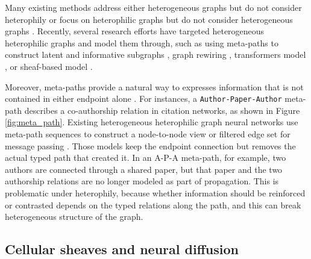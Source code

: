 Many existing methods address either heterogeneous graphs but do not consider heterophily \cite{hu2020heterogeneous,mao2023hinormer,he2024spectral,yang2023simple,wang2019heterogeneous,zhang2019heterogeneous} or focus on heterophilic graphs but do not consider heterogeneous graphs \cite{grover2025spectro, yue2025graph,bodnar2022neural,ribeiro2026cooperative}. Recently, several research efforts have targeted heterogeneous heterophilic graphs and model them through, such as using meta-paths to construct latent and informative subgraphs \cite{lu2026addressing,chen2025adaptive,li2025hetero2net,guo2023homophily,shen2025heterophily,wang2025homophily}, graph rewiring \cite{tao2025cross}, transformers model \cite{lin2025heterophily}, or sheaf-based model \cite{braithwaite2024heterogeneous}.

Moreover, meta-paths provide a natural way to expresses information that is not contained in either
endpoint alone \cite{sun2011pathsim}. For instances, a \texttt{Author-Paper-Author} meta-path describes a co-authorship relation in citation networks, as shown in Figure \ref{fig:meta_path}. Existing heterogeneous heterophilic graph neural networks use meta-path sequences to construct a node-to-node view or filtered edge set for message passing
\cite{lu2026addressing,chen2025adaptive,li2025hetero2net,guo2023homophily,shen2025heterophily,wang2025homophily}.
Those models keep the endpoint connection but removes the actual typed path that created it. In an A-P-A meta-path, for example, two authors are connected through a shared paper, but that paper and the two authorship relations are no longer modeled as part of propagation. This is problematic under heterophily, because whether information should be reinforced or contrasted depends on the typed relations along the path, and this can break heterogeneous structure of the graph.

\subsection{Cellular sheaves and neural diffusion}

